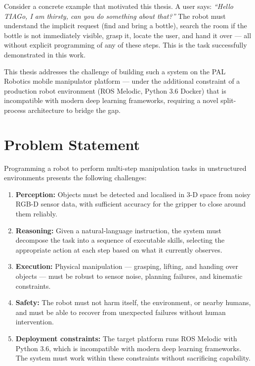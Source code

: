 Consider a concrete example that motivated this thesis.
A user says: \emph{``Hello TIAGo, I am thirsty, can you do something about that?''}
The robot must understand the implicit request (find and bring a bottle), search the
room if the bottle is not immediately visible, grasp it, locate the user, and hand it
over --- all without explicit programming of any of these steps.
This is the task successfully demonstrated in this work.

This thesis addresses the challenge of building such a system on the PAL Robotics
\tiago{} mobile manipulator platform --- under the additional constraint of a
production robot environment (ROS Melodic, Python 3.6 Docker) that is
incompatible with modern deep learning frameworks, requiring a novel split-process
architecture to bridge the gap.

\section{Problem Statement}

Programming a robot to perform multi-step manipulation tasks in unstructured environments
presents the following challenges:

\begin{enumerate}
  \item \textbf{Perception:} Objects must be detected and localised in 3-D space from
        noisy RGB-D sensor data, with sufficient accuracy for the gripper to close around
        them reliably.

  \item \textbf{Reasoning:} Given a natural-language instruction, the system must
        decompose the task into a sequence of executable skills, selecting the appropriate
        action at each step based on what it currently observes.

  \item \textbf{Execution:} Physical manipulation — grasping, lifting, and handing over
        objects — must be robust to sensor noise, planning failures, and kinematic
        constraints.

  \item \textbf{Safety:} The robot must not harm itself, the environment, or nearby
        humans, and must be able to recover from unexpected failures without human
        intervention.

  \item \textbf{Deployment constraints:} The target platform runs ROS Melodic with
        Python 3.6, which is incompatible with modern deep learning frameworks.
        The system must work within these constraints without sacrificing capability.
\end{enumerate}

